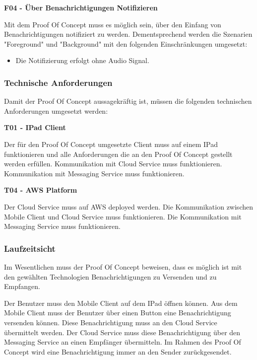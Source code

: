 \textbf{F04 - Über Benachrichtigungen Notifizieren}

Mit dem Proof Of Concept muss es möglich sein, über den Einfang von Benachrichtigungen notifiziert zu werden.
Dementsprechend werden die Szenarien "Foreground" und "Background" mit den folgenden Einschränkungen umgesetzt:

\begin{itemize}
    \item Die Notifizierung erfolgt ohne Audio Signal.
\end{itemize}

\clearpage
\subsubsection{Technische Anforderungen}

Damit der Proof Of Concept aussagekräftig ist, müssen die folgenden technischen Anforderungen umgesetzt werden:

\textbf{T01 - IPad Client}

Der für den Proof Of Concept umgesetzte Client muss auf einem IPad funktionieren und alle Anforderungen die an den
Proof Of Concept gestellt werden erfüllen. Kommunikation mit Cloud Service muss funktionieren. Kommunikation mit Messaging Service muss funktionieren.


\textbf{T04 - AWS Platform}

Der Cloud Service muss auf AWS deployed werden. Die Kommunikation zwischen Mobile Client und Cloud Service muss funktionieren.
Die Kommunikation mit Messaging Service muss funktionieren.


\subsubsection{Laufzeitsicht}

Im Wesentlichen muss der Proof Of Concept beweisen, dass es möglich ist mit den gewählten Technologien Benachrichtigungen zu Versenden und zu Empfangen.

Der Benutzer muss den Mobile Client auf dem IPad öffnen können.
Aus dem Mobile Client muss der Benutzer über einen Button eine Benachrichtigung versenden können.
Diese Benachrichtigung muss an den Cloud Service übermittelt werden.
Der Cloud Service muss diese Benachrichtigung über den Messaging Service an einen Empfänger übermitteln.
Im Rahmen des Proof Of Concept wird eine Benachrichtigung immer an den Sender zurückgesendet.

